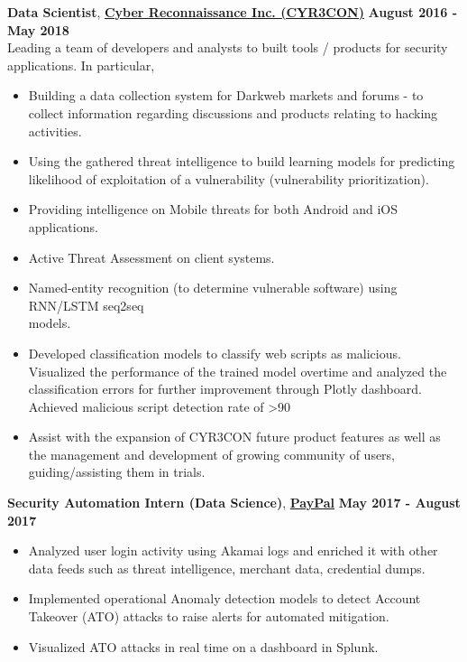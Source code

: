 \documentclass[margin,line]{CV}
\begin{document}
\begin{resume}
{\bf Data Scientist}, \href{http://www.cyr3con.com/}{\bf Cyber Reconnaissance Inc. (CYR3CON)}  \hfill {\bf August 2016 - May 2018}\\
Leading a team of developers and analysts to built tools / products for security applications. In particular,
\begin{itemize}
	\item Building a data collection system for Darkweb markets and forums - to collect information regarding discussions and products relating to hacking activities. 
	\item Using the gathered threat intelligence to build learning models for predicting likelihood of exploitation of a vulnerability (vulnerability prioritization).
	\item Providing intelligence on Mobile threats for both Android and iOS applications.
	\item Active Threat Assessment on client systems. 
	\item Named-entity recognition (to determine vulnerable software) using RNN/LSTM seq2seq\\ models.
	\item Developed classification models to classify web scripts as malicious. Visualized the performance of the trained model overtime and analyzed the classification errors for further improvement through Plotly dashboard. Achieved malicious script detection rate of >90%
	\item Assist with the expansion of CYR3CON future product features as well as the management
	and development of growing community of users, guiding/assisting them in trials.
\end{itemize}



{\bf Security Automation Intern (Data Science)}, \href{https://www.paypal.com/us/home}{\bf PayPal}  \hfill {\bf May 2017 - August 2017}
\begin{itemize}
    \item Analyzed user login activity using Akamai logs and enriched it with other data feeds such as threat intelligence, merchant data, credential dumps.
	\item Implemented operational Anomaly detection models to detect Account Takeover (ATO) attacks to raise alerts for automated mitigation.  
	\item Visualized ATO attacks in real time on a dashboard in Splunk.
	
\end{itemize}



\end{resume}
\end{document}
